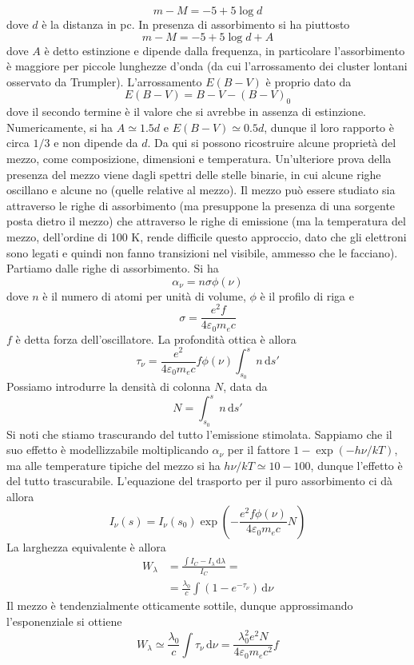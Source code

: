 \documentclass[a4paper,11pt]{article}
\renewcommand{\d}{\mathrm{d}} %
\renewcommand{\d}{\,\mathrm{d}}
\theoremstyle{theorem}
\theoremstyle{definition}
\begin{document}
\begin{itemize}
		\[m-M=-5+5\log d\]
		dove $d$ è la distanza in pc. In presenza di assorbimento si ha piuttosto
		\[m-M=-5+5\log d+A\]
		dove $A$ è detto estinzione e dipende dalla frequenza, in particolare l'assorbimento è maggiore per piccole lunghezze d'onda (da cui l'arrossamento dei cluster lontani osservato da Trumpler). L'arrossamento $E(B-V)$ è proprio dato da
		\[E(B-V)=B-V-(B-V)_0\]
		dove il secondo termine è il valore che si avrebbe in assenza di estinzione. Numericamente, si ha $A\simeq 1.5 d$ e $E(B-V)\simeq 0.5 d$, dunque il loro rapporto è circa $1/3$ e non dipende da $d$. Da qui si possono ricostruire alcune proprietà del mezzo, come composizione, dimensioni e temperatura. Un'ulteriore prova della presenza del mezzo viene dagli spettri delle stelle binarie, in cui alcune righe oscillano e alcune no (quelle relative al mezzo). Il mezzo può essere studiato sia attraverso le righe di assorbimento (ma presuppone la presenza di una sorgente posta dietro il mezzo) che attraverso le righe di emissione (ma la temperatura del mezzo, dell'ordine di 100 K, rende difficile questo approccio, dato che gli elettroni sono legati e quindi non fanno transizioni nel visibile, ammesso che le facciano). Partiamo dalle righe di assorbimento. Si ha
		\[\alpha_\nu=n\sigma\phi(\nu)\]
		dove $n$ è il numero di atomi per unità di volume, $\phi$ è il profilo di riga e
		\[\sigma=\frac{e^2f}{4\varepsilon_0m_ec}\]
		$f$ è detta forza dell'oscillatore. La profondità ottica è allora
		\[\tau_\nu=\frac{e^2}{4\varepsilon_0m_ec}f\phi(\nu)\int_{s_0}^{s}n\d s'\]
		Possiamo introdurre la densità di colonna $N$, data da
		\[N=\int_{s_0}^{s}n\d s'\]
		Si noti che stiamo trascurando del tutto l'emissione stimolata. Sappiamo che il suo effetto è modellizzabile moltiplicando $\alpha_\nu$ per il fattore $1-\exp(-h\nu/kT)$, ma alle temperature tipiche del mezzo si ha $h\nu/kT\simeq 10-100$, dunque l'effetto è del tutto trascurabile. L'equazione del trasporto per il puro assorbimento ci dà allora
		\[I_\nu(s)=I_\nu(s_0)\exp\left(-\frac{e^2f\phi(\nu)}{4\varepsilon_0m_ec}N\right)\]
		La larghezza equivalente è allora
		\begin{align*}
			W_\lambda&=\frac{\int I_C-I_\lambda\d\lambda}{I_C}=\\&=\frac{\lambda_0}{c}\int(1-e^{-\tau_\nu})\d\nu
		\end{align*}
		Il mezzo è tendenzialmente otticamente sottile, dunque approssimando l'esponenziale si ottiene
		\[W_\lambda\simeq\frac{\lambda_0}{c}\int\tau_\nu\d\nu=\frac{\lambda_0^2e^2N}{4\varepsilon_0m_ec^2}f\]

\end{itemize}
\end{document}
